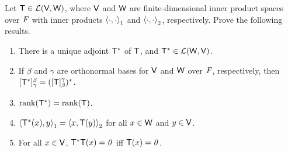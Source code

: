 \begin{ex}\label{ex:6.3.15}
	Let \(\mathsf{T} \in \mathcal{L}(\mathsf{V}, \mathsf{W})\), where \(\mathsf{V}\) and \(\mathsf{W}\) are finite-dimensional inner product spaces over \(\mathit{F}\) with inner products \(\left\langle\cdot, \cdot\right\rangle_1\) and \(\left\langle\cdot, \cdot\right\rangle_2\), respectively.
	Prove the following results.
	\begin{enumerate}
		\item There is a unique adjoint \(\mathsf{T}^*\) of \(\mathsf{T}\), and \(\mathsf{T}^* \in \mathcal{L}(\mathsf{W}, \mathsf{V})\).
		\item If \(\beta\) and \(\gamma\) are orthonormal bases for \(\mathsf{V}\) and \(\mathsf{W}\) over \(\mathit{F}\), respectively, then \([\mathsf{T}^*]_{\gamma}^{\beta} = ([\mathsf{T}]_{\beta}^{\gamma})^*\).
		\item \(\rk{\T^*} = \rk{\T}\).
		\item \(\left\langle\mathsf{T}^*(x), y\right\rangle_1 = \left\langle x, \mathsf{T}(y)\right\rangle_2\) for all \(x \in \mathsf{W}\) and \(y \in \mathsf{V}\).
		\item For all \(x \in \mathsf{V}\), \(\mathsf{T}^* \mathsf{T}(x) = \mathit{0}\) iff \(\mathsf{T}(x) = \mathit{0}\).
	\end{enumerate}
\end{ex}

